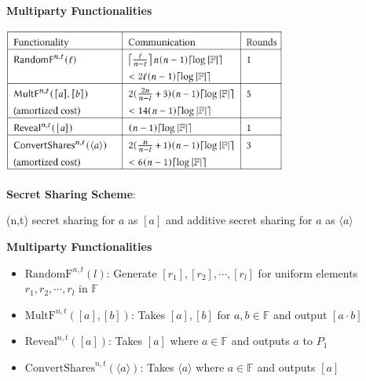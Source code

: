 \begin{frame}

    \centering\textbf{Multiparty Functionalities}

    \vspace{0.5cm}
    
    \centering\includegraphics[width=0.7\textwidth]{figure/func.png}

    \vspace{0.4cm}

    \textbf{Secret Sharing Scheme}:

    (n,t) secret sharing for $a$ as $[a]$ and additive secret sharing for $a$ as $\langle a \rangle$

\end{frame}

\begin{frame}

    \textbf{Multiparty Functionalities}

    \vspace{0.5cm}
    
    \begin{itemize}
        \item     $\text{RandomF}^{n,t}(l)$: Generate $[r_1],[r_2],\cdots,[r_l]$ for uniform elements $r_1,r_2,\cdots,r_l$ in $\mathbb{F} $
        
        \item     $\text{MultF}^{n,t}([a],[b])$: Takes $[a],[b]$ for $a,b \in \mathbb{F} $ and output $[a \cdot b]$

        \item $\text{Reveal}^{n,t}([a])$: Takes $[a]$ where $a \in \mathbb{F} $ and outputs $a$ to $P_1$
        \item $\text{ConvertShares}^{n,t}(\langle a \rangle)$: Takes $\langle a \rangle$ where $a \in \mathbb{F} $ and outputs $[a]$ 
        

    \end{itemize}

\end{frame}


